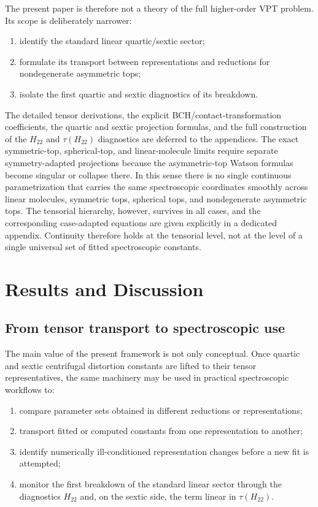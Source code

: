 \documentclass[aip,jcp,reprint,floatfix]{revtex4-2}
\begin{document}
The present paper is therefore not a theory of the full higher-order VPT problem.
Its scope is deliberately narrower:
\begin{enumerate}
\item identify the standard linear quartic/sextic sector;
\item formulate its transport between representations and reductions for
nondegenerate asymmetric tops;
\item isolate the first quartic and sextic diagnostics of its breakdown.
\end{enumerate}

The detailed tensor derivations, the explicit BCH/contact-transformation
coefficients, the quartic and sextic projection formulas, and the full
construction of the $H_{22}$ and $\tau(H_{22})$ diagnostics are
deferred to the appendices. The exact symmetric-top, spherical-top, and
linear-molecule limits require separate symmetry-adapted projections because
the asymmetric-top Watson formulas become singular or collapse there. In this
sense there is no single continuous parametrization that carries the same
spectroscopic coordinates smoothly across linear molecules, symmetric tops,
spherical tops, and nondegenerate asymmetric tops. The tensorial hierarchy,
however, survives in all cases, and the corresponding case-adapted equations
are given explicitly in a dedicated appendix. Continuity therefore holds at
the tensorial level, not at the level of a single universal set of fitted
spectroscopic constants.


\section{Results and Discussion}

\subsection{From tensor transport to spectroscopic use}

The main value of the present framework is not only conceptual. Once quartic
and sextic centrifugal distortion constants are lifted to their tensor
representatives, the same machinery may be used in practical spectroscopic
workflows to:
\begin{enumerate}
\item compare parameter sets obtained in different reductions or
representations;
\item transport fitted or computed constants from one representation to
another;
\item identify numerically ill-conditioned representation changes before a new
fit is attempted;
\item monitor the first breakdown of the standard linear sector through the
diagnostics $H_{22}$ and, on the sextic side, the term linear in
$\tau(H_{22})$.
\end{enumerate}
\end{document}
